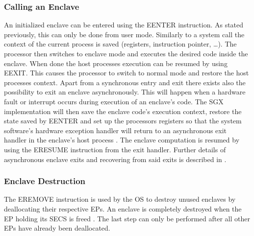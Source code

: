 \subsubsection{Calling an Enclave}
An initialized enclave can be entered using the EENTER instruction. As stated previously, this can only be done from user mode. Similarly to a system call the context of the current
process is saved (registers, instruction pointer, \dots). The processor then switches to enclave mode and executes the desired code inside the enclave. When done the host processes
execution can be resumed by using EEXIT. This causes the processor to switch to normal mode and restore the host processes context. Apart from a synchronous entry and exit there
exists also the possibility to exit an enclave asynchronously. This will happen when a hardware fault or interrupt occurs during execution of an enclave's code. The SGX
implementation will then save the enclave code's execution context, restore the state saved by EENTER and set up the processors registers so that the system software’s hardware 
exception handler will return to an asynchronous exit handler in the enclave’s host process \cite{Costan2016IntelSE}. The enclave computation is resumed by using the ERESUME
instruction from the exit handler. Further details of asynchronous enclave exits and recovering from said exits is described in \cite{Costan2016IntelSE}.

\subsubsection{Enclave Destruction}
The EREMOVE instruction is used by the OS to destroy unused enclaves by deallocating their respective EPs. An enclave is completely destroyed when the EP holding its SECS is freed
\cite{Costan2016IntelSE}. The last step can only be performed after all other EPs have already been deallocated.